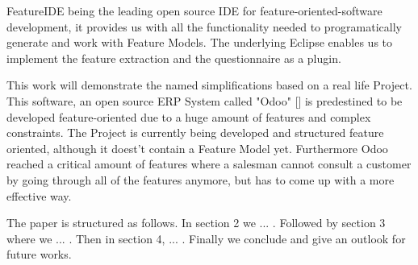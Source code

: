 FeatureIDE being the leading open source IDE for feature-oriented-software development, it provides us with all the functionality needed to programatically generate and work with Feature Models. The underlying Eclipse enables us to implement the feature extraction and the questionnaire as a plugin.

This work will demonstrate the named simplifications based on a real life Project. This software, an open source ERP System called "Odoo" [] is predestined to be developed feature-oriented due to a huge amount of features and complex constraints. The Project is currently being developed and structured feature oriented, although it doest't contain a Feature Model yet. Furthermore Odoo reached a critical amount of features where a salesman cannot consult a customer by going through all of the features anymore, but has to come up with a more effective way.

The paper is structured as follows. In section 2 we ... . Followed by section 3 where we ... . Then in section 4, ... . Finally we conclude and give an outlook for future works.